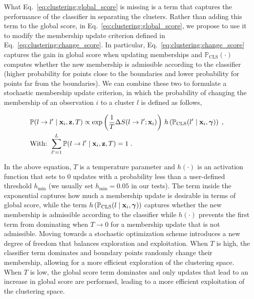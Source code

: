\smallskip
What Eq.~\eqref{eq:clustering:global_score} is missing is a term that captures the performance of the classifier in separating the clusters. Rather than adding this term to the global score, in Eq.~\eqref{eq:clustering:global_score}, we propose to use it to modify the membership update criterion defined in Eq.~\eqref{eq:clustering:change_score}. In particular, Eq.~\eqref{eq:clustering:change_score} captures the gain in global score when updating memberships and $\mathbb{P}_{\mathrm{CLS}}(\cdot)$ computes whether the new membership is admissible according to the classifier (higher probability for points close to the boundaries and lower probability for points far from the boundaries). We can combine these two to formulate a stochastic membership update criterion, in which the probability of changing the membership of an observation $i$ to a cluster $l$ is defined as follows,

\begin{equation}
  \left.
\begin{aligned}
  &\mathbb{P}(l \rightarrow l^{\prime} \mid \mathbf{x}_i, \mathbf{z}, T) \propto \exp \left( \dfrac{1}{T}\Delta S (l \rightarrow l^\prime; \mathbf{x}_i)\right) \, h\left(\mathbb{P}_{\mathrm{CLS}}(l^\prime \mid \mathbf{x}_i, \boldsymbol{\gamma}) \right) \;,\\
  &\text{With: } \sum_{l^\prime=1}^L \mathbb{P}(l \rightarrow l^\prime \mid \mathbf{x}_i, \mathbf{z}, T) = 1 \;.
\end{aligned}
  \right.
  \label{eq:clustering:membership_update_prob}
\end{equation}

In the above equation, $T$ is a temperature parameter and $h(\cdot)$ is an activation function that sets to $0$ updates with a probability less than a user-defined threshold $h_{\min}$ (we usually set $h_{\min} = 0.05$ in our tests). The term inside the exponential captures how much a membership update is desirable in terms of global score, while the term $h\left(\mathbb{P}_{\mathrm{CLS}}(l \mid \mathbf{x}_i, \boldsymbol{\gamma}) \right)$ captures whether the new membership is admissible according to the classifier while $h(\cdot)$ prevents the first term from dominating when $T\rightarrow 0$ for a membership update that is not admissible. Moving towards a stochastic optimization scheme introduces a new degree of freedom that balances exploration and exploitation. When $T$ is high, the classifier term dominates and boundary points randomly change their membership, allowing for a more efficient exploration of the clustering space. When $T$ is low, the global score term dominates and only updates that lead to an increase in global score are performed, leading to a more efficient exploitation of the clustering space.


